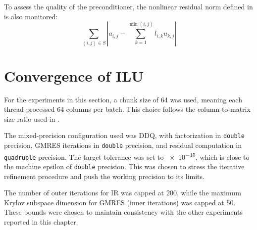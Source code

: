To assess the quality of the preconditioner, the nonlinear residual norm defined
in \cite{chow_fine-grained_2015} is also monitored:
\begin{equation}
  \label{eq:nonlin}
  \sum_{(i,j) \in S}
  \left| a_{i,j} - \sum_{k=1}^{\min(i,j)} l_{i,k}u_{k,j} \right|
\end{equation}

\section{Convergence of ILU}
\label{sec:convergence-ilu}

For the experiments in this section, a chunk size of 64 was used, meaning each
thread processed 64 columns per batch. This choice follows the column-to-matrix
size ratio used in \cite{chow_fine-grained_2015}.

The mixed-precision configuration used was DDQ, with factorization in
\texttt{double} precision, GMRES iterations in \texttt{double} precision, and
residual computation in \texttt{quadruple} precision. The target tolerance was
set to \num{e-15}, which is close to the machine epsilon of \texttt{double}
precision. This was chosen to stress the iterative refinement procedure and push
the working precision to its limits.

The number of outer iterations for IR was capped at 200, while the maximum
Krylov subspace dimension for GMRES (inner iterations) was capped at 50. These
bounds were chosen to maintain consistency with the other experiments reported
in this chapter.

